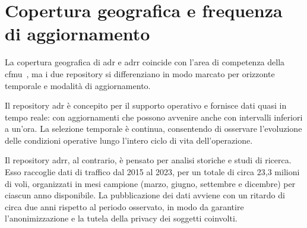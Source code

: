 

%    
\section{Copertura geografica e frequenza di aggiornamento}
La copertura geografica di \gls{adr} e \gls{adrr} coincide con l'area di competenza della \gls{cfmu}~\cite{eurocontrol2025adr}, ma i due repository si differenziano in modo marcato per orizzonte temporale e modalità di aggiornamento.

Il repository \gls{adr} è concepito per il supporto operativo e fornisce dati quasi in tempo reale: con aggiornamenti che possono avvenire anche con intervalli inferiori a un'ora. La selezione temporale è continua, consentendo di osservare l'evoluzione delle condizioni operative lungo l'intero ciclo di vita dell'operazione.

Il repository \gls{adrr}, al contrario, è pensato per analisi storiche e studi di ricerca. Esso raccoglie dati di traffico dal 2015 al 2023, per un totale di circa 23{,}3 milioni di voli, organizzati in mesi campione (marzo, giugno, settembre e dicembre) per ciascun anno disponibile. La pubblicazione dei dati avviene con un ritardo di circa due anni rispetto al periodo osservato, in modo da garantire l'anonimizzazione e la tutela della privacy dei soggetti coinvolti.

